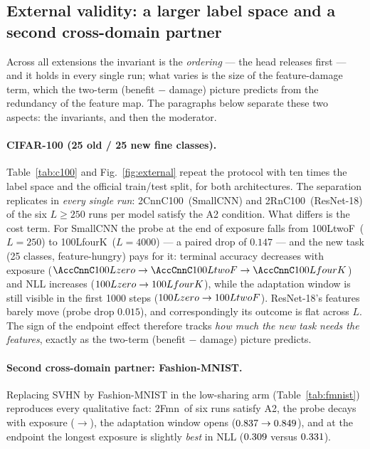 \documentclass[review,12pt]{elsarticle}
\begin{document}


\subsection{External validity: a larger label space and a second cross-domain
partner}
\label{sec:external}
Across all extensions the invariant is the \emph{ordering} --- the head
releases first --- and it holds in every single run; what varies is the size
of the feature-damage term, which the two-term (benefit $-$ damage) picture
predicts from the redundancy of the feature map. The paragraphs below separate
these two aspects: the invariants, and then the moderator.

\paragraph{CIFAR-100 (25 old / 25 new fine classes).}
Table~\ref{tab:c100} and Fig.~\ref{fig:external} repeat the protocol with ten
times the label space and the official train/test split, for both
architectures. The separation
replicates in \emph{every single run}: \A2CnnC100\ (SmallCNN) and \A2RnC100\
(ResNet-18) of the six $L\ge250$ runs per model satisfy the A2 condition.
What differs is the cost term. For SmallCNN the probe at the end of exposure
falls from \ProbeCnnC100LtwoF\ ($L{=}250$) to \ProbeCnnC100LfourK\
($L{=}4000$) --- a paired drop of $0.147$ --- and the new task (25 classes,
feature-hungry) pays for it: terminal accuracy decreases with exposure
($\AccCnnC100Lzero\to\AccCnnC100LtwoF\to\AccCnnC100LfourK$) and NLL increases
($\NllCnnC100Lzero\to\NllCnnC100LfourK$), while the adaptation window is still
visible in the first 1000 steps ($\SpdCnnC100Lzero\to\SpdCnnC100LtwoF$).
ResNet-18's features barely move (probe drop $0.015$), and correspondingly
its outcome is flat across $L$. The sign of the endpoint effect therefore
tracks \emph{how much the new task needs the features}, exactly as the
two-term (benefit $-$ damage) picture predicts.



\paragraph{Second cross-domain partner: Fashion-MNIST.}
Replacing SVHN by Fashion-MNIST in the low-sharing arm
(Table~\ref{tab:fmnist}) reproduces every qualitative fact: \A2Fmn\ of six runs
satisfy A2, the probe decays with exposure
(\ProbeFmnLtwoF$\to$\ProbeFmnLfourK), the adaptation window opens
($0.837\to0.849$), and at the endpoint the longest exposure is
slightly \emph{best} in NLL ($0.309$ versus $0.331$).
\end{document}
